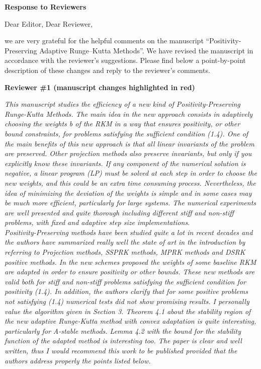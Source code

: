 \documentclass[11pt]{letter}
\newcommand{\revA}[1]{{\color{red}#1}}
\begin{document}
\begin{letter}{}

\textbf{Response to Reviewers}

\opening{Dear Editor, Dear Reviewer,}

we are very grateful for the helpful comments on the manuscript
``Positivity-Preserving Adaptive Runge--Kutta Methods''.
We have revised the manuscript in accordance with the reviewer's suggestions.
Please find below a point-by-point description of these changes and reply to
the reviewer's comments.



\textbf{\large Reviewer \#1 \revA{(manuscript changes highlighted in red)}}

\emph{%
This manuscript studies the efficiency of a new kind of Positivity-Preserving
Runge-Kutta Methods. The main idea in the new approach consists in adaptively
choosing the weights b of the RKM in a way that ensures positivity, or other
bound constraints, for problems satisfying the sufficient condition (1.4).
One of the main benefits of this new approach is that all linear invariants of
the problem are preserved. Other projection methods also preserve invariants,
but only if you explicitly know these invariants. If any component of the
numerical solution is negative, a linear program (LP) must be solved at
each step in order to choose the new weights, and this could be an extra time
consuming process. Nevertheless, the idea of minimizing the deviation of the
weights is simple and in some cases may be much more efficient, particularly
for large systems. The numerical experiments are well presented and quite
thorough including different stiff and non-stiff problems, with fixed and
adaptive step size implementations.
\\
Positivity-Preserving methods have been studied quite a lot in recent decades
and the authors have summarized really well the state of art in the introduction
by referring to Projection methods, SSPRK methods, MPRK methods and DSRK positive
methods. In the new schemes proposed the weights of some baseline RKM are adapted
in order to ensure positivity or other bounds. These new methods are valid both
for stiff and non-stiff problems satisfying the sufficient condition for
positivity (1.4). In addition, the authors clarify that for some positive
problems not satisfying (1.4) numerical tests did not show promising results.
I personally value the algorithm given in Section 3. Theorem 4.1 about the
stability region of the new adaptive Runge-Kutta method with convex adaptation
is quite interesting, particularly for A-stable methods. Lemma 4.2 with the
bound for the stability function of the adapted method is interesting too. The
paper is clear and well written, thus I would recommend this work to be published
provided that the authors address properly the points listed below.
}


\end{letter}
\end{document}
